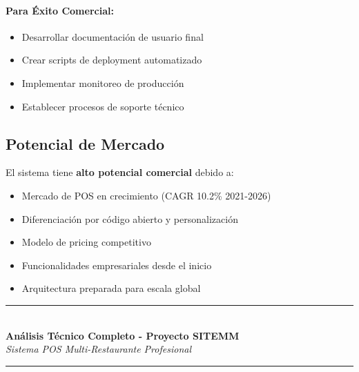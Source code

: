 \documentclass[12pt,a4paper]{article}
\begin{document}
\paragraph{Para Éxito Comercial:}
\begin{itemize}
    \item Desarrollar documentación de usuario final
    \item Crear scripts de deployment automatizado
    \item Implementar monitoreo de producción
    \item Establecer procesos de soporte técnico
\end{itemize}

\subsection{Potencial de Mercado}

El sistema tiene \textcolor{secondarygreen}{\textbf{alto potencial comercial}} debido a:

\begin{itemize}
    \item Mercado de POS en crecimiento (CAGR 10.2\% 2021-2026)
    \item Diferenciación por código abierto y personalización
    \item Modelo de pricing competitivo
    \item Funcionalidades empresariales desde el inicio
    \item Arquitectura preparada para escala global
\end{itemize}

\vspace{1cm}

\begin{center}
\textcolor{primaryblue}{\rule{10cm}{2pt}}\\
\vspace{0.5cm}
\textbf{\large Análisis Técnico Completo - Proyecto SITEMM}\\
\textit{Sistema POS Multi-Restaurante Profesional}\\
\vspace{0.5cm}
\textcolor{primaryblue}{\rule{10cm}{2pt}}
\end{center}
\end{document}
